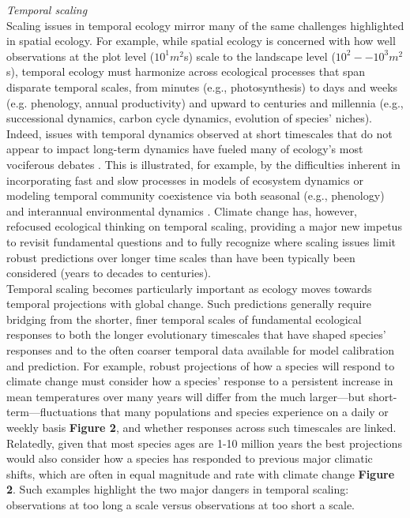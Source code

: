 \documentclass[11pt,a4paper,oneside]{article}
\begin{document}
\noindent \emph{Temporal scaling}\\
Scaling issues in temporal ecology mirror many of the same challenges highlighted in spatial ecology. For example, while spatial ecology is concerned with how well observations at the plot level ($10^{1}m^2$s) scale to the landscape level ($10^{2}--10^{3}m^2$s), temporal ecology must harmonize across ecological processes that span disparate temporal scales, from minutes (e.g., photosynthesis) to days and weeks (e.g. phenology, annual productivity) and upward to centuries and millennia (e.g., successional dynamics, carbon cycle dynamics, evolution of species' niches). Indeed, issues with temporal dynamics observed at short timescales that do not appear to impact long-term dynamics have fueled many of ecology's most vociferous debates \citep{wiens1986}. This is illustrated, for example, by the difficulties inherent in incorporating fast and slow processes in models of ecosystem dynamics \citep{Carpenter2000} or modeling temporal community coexistence via both seasonal (e.g., phenology) and interannual environmental dynamics \citep{Chesson:1997dz}. Climate change has, however, refocused ecological thinking on temporal scaling, providing a major new impetus to revisit fundamental questions and to fully recognize where scaling issues limit robust predictions over longer time scales than have been typically been considered (years to decades to centuries).\\

Temporal scaling becomes particularly important as ecology moves towards temporal projections with global change. Such predictions generally require bridging from the shorter, finer temporal scales of fundamental ecological responses to both the longer evolutionary timescales that have shaped species' responses and to the often coarser temporal data available for model calibration and prediction. For example, robust projections of how a species will respond to climate change must consider how a species' response to a persistent increase in mean temperatures over many years will differ from the much larger---but short-term---fluctuations that many populations and species experience on a daily or weekly basis {\bf Figure 2}, and whether responses across such timescales are linked. Relatedly, given that most species ages are 1-10 million years \citep{lawtonbook} the best projections would also consider how a species has responded to previous major climatic shifts, which are often in equal magnitude and rate with climate change {\bf Figure 2}. Such examples highlight the two major dangers in temporal scaling: observations at too long a scale versus observations at too short a scale.\\
\end{document}
